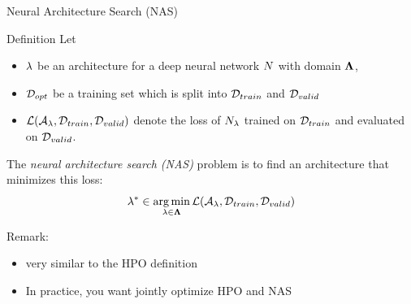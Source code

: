 \begin{frame}[c]{Neural Architecture Search (NAS)}

\begin{block}{Definition}
	Let 
	\begin{itemize}
		\item $\mathbf{\lambda}$ be \alert{an architecture for a deep neural network $N$} with domain $\mathbf{\Lambda}$,
		\item $\mathcal{D}_{opt}$ be a training set which is split into $\mathcal{D}_{train}$ and $\mathcal{D}_{valid}$ 
		\item $\mathcal{L}(\mathcal{A}_{\mathbf{\lambda}}, \mathcal{D}_{train}, \mathcal{D}_{valid})$ denote the loss of $N_{\mathbf{\lambda}}$ trained on $\mathcal{D}_{train}$ and evaluated on $\mathcal{D}_{valid}$.
	\end{itemize}
	The \emph{neural architecture search (NAS)} problem is to find an architecture that minimizes this loss:
	\begin{equation}
	\mathbf{\lambda}^* \in \operatorname*{arg\,min}_{\mathbf{\lambda} \in \mathbf{\Lambda}} \mathcal{L}(\mathcal{A}_{\mathbf{\lambda}}, \mathcal{D}_{train}, \mathcal{D}_{valid}) \nonumber  
	\end{equation}
\end{block}

\pause
\smallskip
Remark:
\begin{itemize}
	\item very similar to the HPO definition
	\pause
	\item In practice, you want jointly optimize HPO and NAS~
\end{itemize}

\end{frame}
